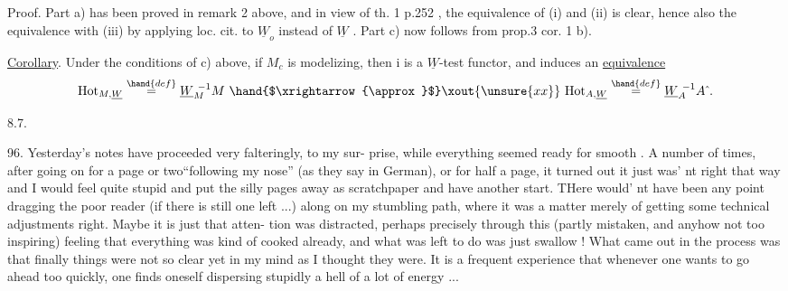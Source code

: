 
Proof. Part a) has been proved in remark 2 above, and in view of
th. 1  p.252 , the equivalence of (i) and (ii) is clear,
hence also the equivalence with (iii) by applying loc. cit. to $\underline{W}_o$
instead of $\underline{W}$ . Part c) now follows from prop.3 cor. 1 b).

\uline{Corollary}. Under the conditions of c) above, if $M_c$ is modelizing,
then i is a $\underline{W}$-test functor, and induces an \uline{equivalence}
\[ \mathrm{Hot}_{M,\underline{W}} \overset{\hand{def}}{=} \underline{W}_M^{\ -1} M \ \hand{$\xrightarrow{\approx}$}\xout{\unsure{xx}}\ \mathrm{Hot}_{A,\underline{W}} \overset{\hand{def}}{=} \underline{W}_A^{\ -1}A\hat{\ } . \]

8.7.

96. Yesterday's notes have proceeded very falteringly, to my sur-%
prise, while everything seemed ready for smooth . A number
of times, after going on for a page or two``following my nose'' (as
they say in German), or for half a page, it turned out it just was'
nt right that way and I would  feel quite stupid and put the silly
pages away as scratchpaper and  have another start. THere would'
nt have been any point dragging the poor reader (if there is still one
left ...) along on my stumbling path, where it was a matter merely of
getting some technical adjustments right. Maybe it is just that atten-%
tion was distracted, perhaps precisely through this (partly mistaken,
and anyhow not too inspiring) feeling that everything was kind of
cooked already, and what was left to do was just swallow ! What came
out in the process was that finally things were not so clear yet in my
mind as I  thought they were. It is a frequent experience
that whenever one wants to go ahead too quickly, one finds oneself
dispersing stupidly a hell of a lot of energy ...


